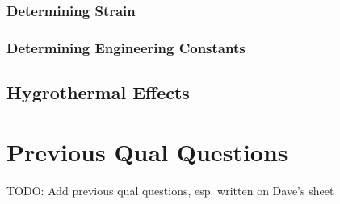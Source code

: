 \documentclass[11pt]{article}
\begin{document}
    \subsubsection{Determining Strain}

    \subsubsection{Determining Engineering Constants}

    \subsection{Hygrothermal Effects}





    \section{Previous Qual Questions}

    TODO: Add previous qual questions, esp. written on Dave's sheet
\end{document}
